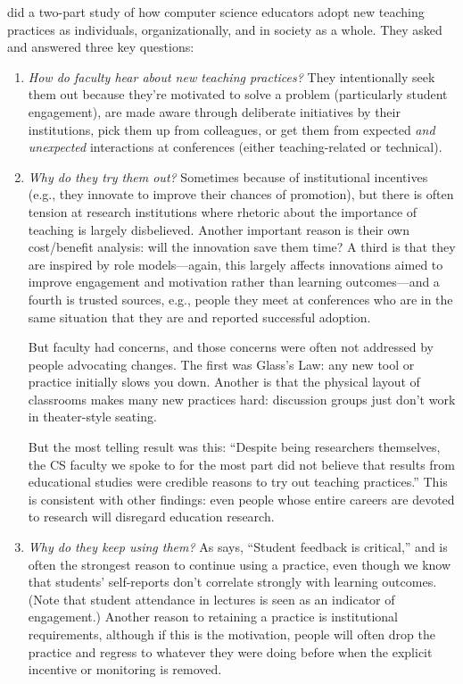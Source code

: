 \cite{Bark2015} did a two-part study of how computer science educators
adopt new teaching practices as individuals, organizationally, and in
society as a whole.  They asked and answered three key questions:

\begin{enumerate}

\item
  \emph{How do faculty hear about new teaching practices?}  They
  intentionally seek them out because they're motivated to solve a
  problem (particularly student engagement), are made aware through
  deliberate initiatives by their institutions, pick them up from
  colleagues, or get them from expected \emph{and unexpected}
  interactions at conferences (either teaching-related or technical).

\item
  \emph{Why do they try them out?}  Sometimes because of institutional
  incentives (e.g., they innovate to improve their chances of
  promotion), but there is often tension at research institutions
  where rhetoric about the importance of teaching is largely
  disbelieved.  Another important reason is their own cost/benefit
  analysis: will the innovation save them time?  A third is that they
  are inspired by role models---again, this largely affects
  innovations aimed to improve engagement and motivation rather than
  learning outcomes---and a fourth is trusted sources, e.g., people
  they meet at conferences who are in the same situation that they are
  and reported successful adoption.

  But faculty had concerns, and those concerns were often not
  addressed by people advocating changes.  The first was Glass's Law:
  any new tool or practice initially slows you down.  Another is that
  the physical layout of classrooms makes many new practices hard:
  discussion groups just don't work in theater-style seating.

  But the most telling result was this: ``Despite being researchers
  themselves, the CS faculty we spoke to for the most part did not
  believe that results from educational studies were credible reasons
  to try out teaching practices.'' This is consistent with other
  findings: even people whose entire careers are devoted to research
  will disregard education research.

\item
  \emph{Why do they keep using them?}  As \cite{Bark2015} says,
  ``Student feedback is critical,'' and is often the strongest reason
  to continue using a practice, even though we know that students'
  self-reports don't correlate strongly with learning outcomes.  (Note
  that student attendance in lectures is seen as an indicator of
  engagement.)  Another reason to retaining a practice is
  institutional requirements, although if this is the motivation,
  people will often drop the practice and regress to whatever they
  were doing before when the explicit incentive or monitoring is
  removed.

\end{enumerate}


